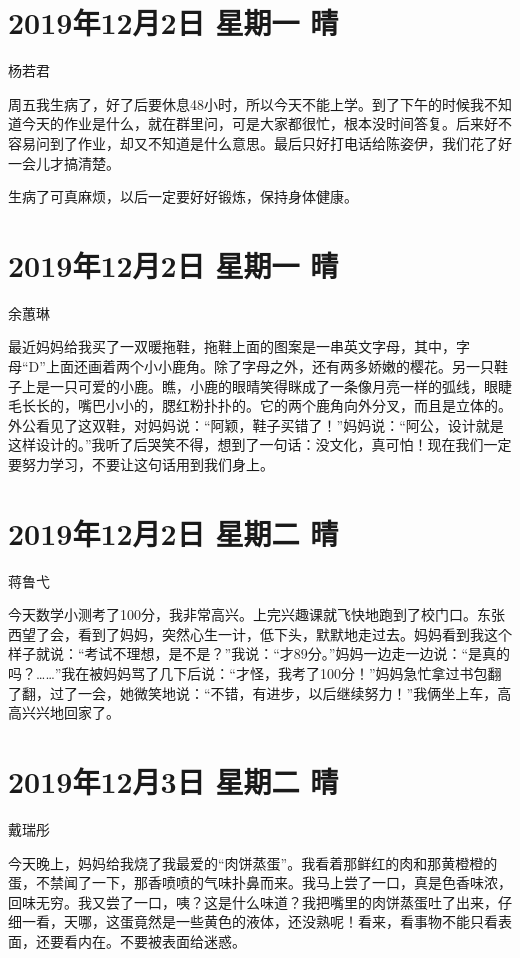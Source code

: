 \section{2019年12月2日 星期一 晴}

杨若君

周五我生病了，好了后要休息48小时，所以今天不能上学。到了下午的时候我不知道今天的作业是什么，就在群里问，可是大家都很忙，根本没时间答复。后来好不容易问到了作业，却又不知道是什么意思。最后只好打电话给陈姿伊，我们花了好一会儿才搞清楚。

生病了可真麻烦，以后一定要好好锻炼，保持身体健康。

\section{2019年12月2日 星期一 晴}

余蕙琳

最近妈妈给我买了一双暖拖鞋，拖鞋上面的图案是一串英文字母，其中，字母``D''上面还画着两个小小鹿角。除了字母之外，还有两多娇嫩的樱花。另一只鞋子上是一只可爱的小鹿。瞧，小鹿的眼晴笑得眯成了一条像月亮一样的弧线，眼睫毛长长的，嘴巴小小的，腮红粉扑扑的。它的两个鹿角向外分叉，而且是立体的。外公看见了这双鞋，对妈妈说：``阿颖，鞋子买错了！''妈妈说：``阿公，设计就是这样设计的。''我听了后哭笑不得，想到了一句话：没文化，真可怕！现在我们一定要努力学习，不要让这句话用到我们身上。

\section{2019年12月2日 星期二 晴}

蒋鲁弋

今天数学小测考了100分，我非常高兴。上完兴趣课就飞快地跑到了校门口。东张西望了会，看到了妈妈，突然心生一计，低下头，默默地走过去。妈妈看到我这个样子就说：``考试不理想，是不是？''我说：``才89分。''妈妈一边走一边说：``是真的吗？\ldots\ldots{}''我在被妈妈骂了几下后说：``才怪，我考了100分！''妈妈急忙拿过书包翻了翻，过了一会，她微笑地说：``不错，有进步，以后继续努力！''我俩坐上车，高高兴兴地回家了。

\section{2019年12月3日 星期二 晴}

戴瑞彤

今天晚上，妈妈给我烧了我最爱的``肉饼蒸蛋''。我看着那鲜红的肉和那黄橙橙的蛋，不禁闻了一下，那香喷喷的气味扑鼻而来。我马上尝了一口，真是色香味浓，回味无穷。我又尝了一口，咦？这是什么味道？我把嘴里的肉饼蒸蛋吐了出来，仔细一看，天哪，这蛋竟然是一些黄色的液体，还没熟呢！看来，看事物不能只看表面，还要看内在。不要被表面给迷惑。

